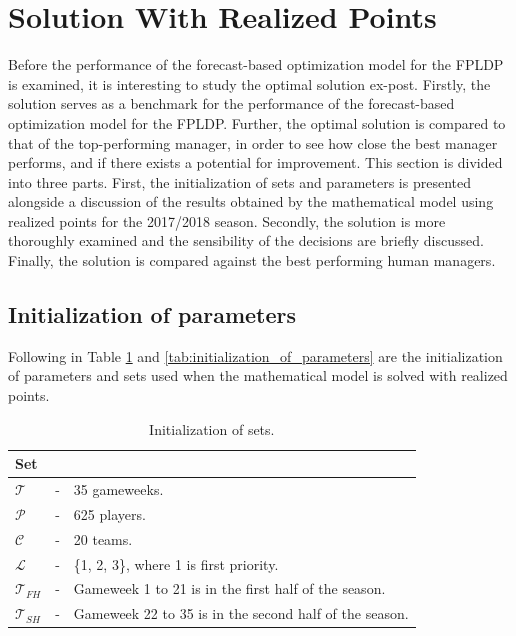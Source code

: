 \section{Solution With Realized Points}\label{sec:exact}


Before the performance of the forecast-based optimization model for the FPLDP is examined, it is interesting to study the optimal solution ex-post. Firstly, the solution serves as a benchmark for the performance of the forecast-based optimization model for the FPLDP. Further, the optimal solution is compared to that of the top-performing manager, in order to see how close the best manager performs, and if there exists a potential for improvement. This section is divided into three parts. First, the initialization of sets and parameters is presented alongside a discussion of the results obtained by the mathematical model using realized points for the 2017/2018 season. Secondly, the solution is more thoroughly examined and the sensibility of the decisions are briefly discussed. Finally, the solution is compared against the best performing human managers. 


\subsection{Initialization of parameters}    

Following in Table \ref{tab:initializations_of_sets} and \ref{tab:initialization_of_parameters} are the initialization of parameters and sets used when the mathematical model is solved with realized points. 

\begin{table}[H]
\centering

\begin{tabular}{@{}lll@{}}
\toprule
Set           &   &                                                               \\ \midrule
$\mathcal{T}$ & - & 35 gameweeks.                                             \\
$\mathcal{P}$ & - & 625 players.                                              \\
$\mathcal{C}$ & - & 20 teams.                                                 \\
$\mathcal{L}$ & - & \{1, 2, 3\}, where 1 is first priority. \\
$\mathcal{T}_{FH}$ & - & Gameweek 1 to 21 is in the first half of the season. \\
$\mathcal{T}_{SH}$ & - & Gameweek 22 to 35 is in the second half of the season. \\
\bottomrule
\end{tabular}
\caption{Initialization of sets.}
\label{tab:initializations_of_sets}
\end{table}


